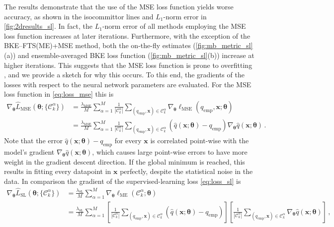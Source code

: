 \documentclass{article}
\numberwithin{equation}{section}
\def\*#1{\mathbf{#1}}
\theoremstyle{definition}
\theoremstyle{remark}
\def\thetab{\boldsymbol{\theta}}
\begin{document}
The results demonstrate that the use of the MSE loss function yields worse accuracy, as shown in the isocommittor lines and $L_1$-norm error in \cref{fig:2dresults_sl}. In fact, the $L_1$-norm error of all methods employing the MSE loss function increases at later iterations. Furthermore, with the exception of the BKE--FTS(ME)+MSE method, both the on-the-fly estimates (\cref{fig:mb_metric_sl}(a)) and ensemble-averaged BKE loss function (\cref{fig:mb_metric_sl}(b)) increase at higher iterations. This suggests that the MSE loss function is prone to overfitting \cite{hardtrecht}, and we provide a sketch for why this occurs. 
To this end, the gradients of the losses with respect to the neural network parameters are evaluated.
For the MSE loss function in \cref{eq:loss_mse} this is
\begin{align}
    \nabla_{\thetab} \hat{L}_{\mathrm{MSE}}(\thetab; \{ \mathcal{C}^\alpha_k \}) &=  \frac{\lambda_{\mathrm{MSE}}}{M} \sum_{\alpha=1}^M \frac{1}{|\mathcal{C}^\alpha_k|} \sum_{(q_{\mathrm{emp}}, \* x) \in \mathcal{C}^\alpha_k}\nabla_{\thetab}  \ell_{\mathrm{MSE}}(q_\mathrm{emp}, \* x; \thetab) 
    \\
    &=\frac{\lambda_{\mathrm{MSE}}}{M} \sum_{\alpha=1}^M \frac{1}{|\mathcal{C}^\alpha_k|} \sum_{(q_{\mathrm{emp}}, \* x) \in \mathcal{C}^\alpha_k} \left( \hat{q}(\* x; \thetab) - q_\mathrm{emp} \right) \nabla_{\thetab} \hat{q}(\* x ; \thetab) \,. \label{eq:grad_mse}
\end{align}
Note that the error $ \hat{q}(\* x; \thetab) - q_\mathrm{emp} $ for every $\* x$ is correlated point-wise with the model's gradient $ \nabla_{\thetab} \hat{q}(\* x ; \thetab)$, which causes large point-wise errors to have more weight in the gradient descent direction. If the global minimum is reached, this results in fitting every datapoint in $\* x$ perfectly, despite the statistical noise in the data. 
In comparison the gradient of the supervised-learning loss \cref{eq:loss_sl} is
\begin{align}
    \nabla_{\thetab} \hat{L}_\mathrm{SL}(\thetab; \{ \mathcal{C}_k^\alpha \}) &= \frac{\lambda_{\mathrm{SL}}}{M} \sum_{\alpha=1}^M \nabla_{\thetab} \ell_{\mathrm{ME}}(\mathcal{C}_{k}^{\alpha}; \thetab) \\ 
                                                                              &= \frac{\lambda_{\mathrm{SL}}}{M} \sum_{\alpha=1}^M \left[ \frac{1}{|\mathcal{C}_{k}^{\alpha}|} \! \sum_{ ( q_\mathrm{emp}, \* x ) \in \mathcal{C}_{k}^{\alpha}} \!\!\!\! (\hat{q}(\* x; \thetab) - q_\mathrm{emp}) \right] \left[ \frac{1}{|\mathcal{C}_{k}^{\alpha}|} \! \sum_{ ( q_\mathrm{emp}, \* x ) \in \mathcal{C}_{k}^{\alpha}} \!\!\!\! \nabla_{\thetab} \hat{q}(\* x; \thetab) \right] \label{eq:grad_mes}  \,,
\end{align}
\end{document}
